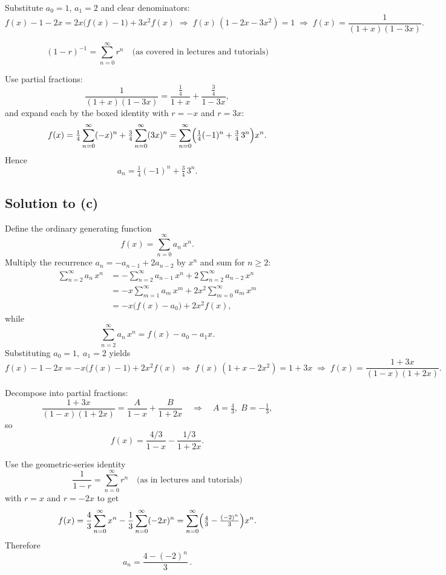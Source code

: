 \documentclass[docmute]{article}
\begin{document}
Substitute \(a_0=1\), \(a_1=2\) and clear denominators:
\[
f(x)-1-2x
=2x\bigl(f(x)-1\bigr)+3x^2f(x)
\;\Longrightarrow\;
f(x)\,(1-2x-3x^2)=1
\;\Longrightarrow\;
f(x)=\frac{1}{(1+x)(1-3x)}.
\]

\[
\boxed{
(1 - r)^{-1}
= \sum_{n=0}^\infty r^n
\quad\text{(as covered in lectures and tutorials)}
}
\]

Use partial fractions:
\[
\frac{1}{(1+x)(1-3x)}
=\frac{\tfrac14}{1+x}+\frac{\tfrac34}{1-3x},
\]
and expand each by the boxed identity with \(r=-x\) and \(r=3x\):
\[
f(x)
=\tfrac14\sum_{n=0}^\infty(-x)^n
+\tfrac34\sum_{n=0}^\infty(3x)^n
=\sum_{n=0}^\infty\Bigl(\tfrac14(-1)^n+\tfrac34\,3^n\Bigr)x^n.
\]
Hence
\[
\boxed{a_n = \tfrac14(-1)^n + \tfrac34\,3^n.}
\]


\subsection*{Solution to (c)}
Define the ordinary generating function
\[
f(x)=\sum_{n=0}^\infty a_n\,x^n.
\]
Multiply the recurrence \(a_n=-a_{n-1}+2a_{n-2}\) by \(x^n\) and sum for \(n\ge2\):
\begin{align*}
\sum_{n=2}^\infty a_n\,x^n
&=-\sum_{n=2}^\infty a_{n-1}\,x^n
+2\sum_{n=2}^\infty a_{n-2}\,x^n\\
&=-x\sum_{m=1}^\infty a_m\,x^m
+2x^2\sum_{m=0}^\infty a_m\,x^m\\
&=-x\bigl(f(x)-a_0\bigr)+2x^2f(x),
\end{align*}
while
\[
\sum_{n=2}^\infty a_n\,x^n=f(x)-a_0-a_1x.
\]
Substituting \(a_0=1,\;a_1=2\) yields
\[
f(x)-1-2x
=-x\bigl(f(x)-1\bigr)+2x^2f(x)
\;\Longrightarrow\;
f(x)\,(1+x-2x^2)=1+3x
\;\Longrightarrow\;
f(x)=\frac{1+3x}{(1-x)(1+2x)}.
\]

Decompose into partial fractions:
\[
\frac{1+3x}{(1-x)(1+2x)}
=\frac{A}{1-x}+\frac{B}{1+2x}
\quad\Longrightarrow\quad
A=\tfrac{4}{3},\;B=-\tfrac{1}{3},
\]
so
\[
f(x)
=\frac{4/3}{1-x}-\frac{1/3}{1+2x}.
\]

Use the geometric‐series identity
\[
\boxed{
\frac{1}{1-r}
=\sum_{n=0}^\infty r^n
\quad\text{(as in lectures and tutorials)}
}
\]
with \(r=x\) and \(r=-2x\) to get
\[
f(x)
=\frac{4}{3}\sum_{n=0}^\infty x^n
-\frac{1}{3}\sum_{n=0}^\infty(-2x)^n
=\sum_{n=0}^\infty\Bigl(\tfrac{4}{3}-\tfrac{(-2)^n}{3}\Bigr)x^n.
\]
Therefore
\[
\boxed{a_n=\frac{4-(-2)^n}{3}\,.}
\]


\end{document}
